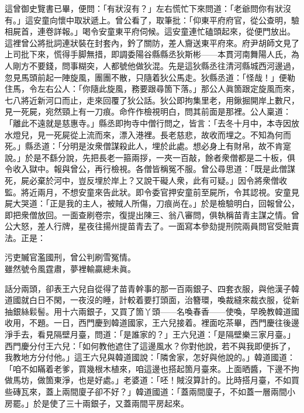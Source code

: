 這曾御史覽書已畢，便問：「有狀沒有？」左右慌忙下來問道：「老爺問你有狀沒有。」這安童向懷中取狀遞上。曾公看了，取筆批：「仰東平府府官，從公查明，驗相屍首，連卷詳報。」喝令安童東平府伺候。這安童連忙磕頭起來，從便門放出。這裡曾公將批詞連狀裝在封套內，鈐了關防，差人齎送東平府來。府尹胡師文見了上司批下來，慌得手脚無措，即調委陽谷縣縣丞狄斯彬——本貫河南舞陽人氏，為人剛方不要錢，問事糊突，人都號他做狄混。先是這狄縣丞往清河縣城西河邊過，忽見馬頭前起一陣旋風，團團不散，只隨着狄公馬走。狄縣丞道：「怪哉！」便勒住馬，令左右公人：「你隨此旋風，務要跟尋箇下落。」{}那公人眞箇跟定旋風而來，七八將近新河口而止，走來回覆了狄公話。狄公即拘集里老，用鍬掘開岸上數尺，見一死屍，宛然頸上有一刀痕。命仵作檢視明白，問其前面是那裡。公人稟道：「離此不遠就是慈惠寺。」縣丞即拘寺中僧行問之，皆言：「去冬十月中，本寺因放水燈兒，見一死屍從上流而來，漂入港裡。長老慈悲，故收而埋之。不知為何而死。」縣丞道：「分明是汝衆僧謀殺此人，埋於此處。想必身上有財帛，故不肯寔說。」於是不繇分說，先把長老一箍兩拶，一夾一百敲，餘者衆僧都是二十板，{}俱令收入獄中。報與曾公，再行檢視。各僧皆稱冤不服。曾公尋思道：「既是此僧謀死，屍必棄於河中，豈反埋於岸上？又說干礙人衆，此有可疑。」因令將衆僧收監。將近兩月，不想安童來告此狀。即令委官押安童前至屍所，令其認視。安童見屍大哭道：「正是我的主人，被賊人所傷，刀痕尚在。」於是檢驗明白，回報曾公，即把衆僧放回。一面查刷卷宗，復提出陳三、翁八審問，俱執稱苗青主謀之情。曾公大怒，差人行牌，星夜往揚州提苗青去了。一面寫本參劾提刑院兩員問官受賍賣法。正是：

\begin{myquote}
污吏贓官濫國刑，曾公判刷雪冤情。\\雖然號令風霆肅，夢裡輸贏總未眞。
\end{myquote}

話分兩頭，卻表王六兒自從得了苗青幹事的那一百兩銀子、四套衣服，與他漢子韓道國就白日不閑，一夜沒的睡，計較着要打頭面，治簪環，喚裁縫來裁衣服，從新抽銀絲鬏髻。用十六兩銀子，又買了箇丫頭——名喚春香——使喚，早晚教韓道國收用，不題。{}一日，西門慶到韓道國家，王六兒接着。裡面吃茶畢，西門慶往後邊淨手去，看見隔壁月臺，問道：「是誰家的？」王六兒道：「是隔壁樂三家月臺。」西門慶分付王六兒：「如何教他遮住了這邊風水？你對他說，若不與我即便拆了，我教地方分付他。」這王六兒與韓道國說：「隣舍家，怎好與他說的。」韓道國道：「咱不如瞞着老爹，買幾根木植來，咱這邊也搭起箇月臺來。上面晒醬，下邊不拘做馬坊，做箇東淨，也是好處。」老婆道：「呸！賊沒算計的。比時搭月臺，不如買些磚瓦來，蓋上兩間廈子卻不好？」韓道國道：「蓋兩間廈子，不如蓋一層兩間小房罷。」於是使了三十兩銀子，又蓋兩間平房起來。

